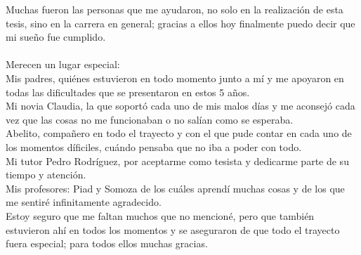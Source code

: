 \begin{acknowledgements}
	Muchas fueron las personas que me ayudaron, no solo en la realización de esta tesis, sino en la carrera en general; gracias a ellos hoy finalmente puedo decir que mi sueño fue cumplido. \\\\

	Merecen un lugar especial:\\
	
	\noindent Mis padres, quiénes estuvieron en todo momento junto a mí y me apoyaron en todas las dificultades que se presentaron en estos 5 años.\\
	
	\noindent Mi novia Claudia, la que soportó cada uno de mis malos días y me aconsejó cada vez que las cosas no me funcionaban o no salían como se esperaba.\\
	
	\noindent Abelito, compañero en todo el trayecto y con el que pude contar en cada uno de los momentos díficiles, cuándo pensaba que no iba a poder con todo.\\
	
	\noindent Mi tutor Pedro Rodríguez, por aceptarme como tesista y dedicarme parte de su tiempo y atención.\\
	
	\noindent Mis profesores: Piad y Somoza de los cuáles aprendí muchas cosas y de los que me sentiré infinitamente agradecido.\\
	
	
	Estoy seguro que me faltan muchos que no mencioné, pero que también estuvieron ahí en todos los momentos y se aseguraron de que todo el trayecto fuera especial; para todos ellos muchas gracias. 
\end{acknowledgements}